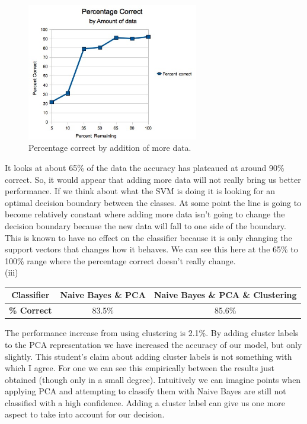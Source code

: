 \documentclass{report}
\begin{document}
\begin{figure}[h]
  \centering
  \includegraphics[height=60mm]{images/DiiChart.jpg}
  \caption{Percentage correct by addition of more data.}
  \label{fig}
\end{figure}
It looks at about 65\% of the data the accuracy has plateaued at around 90\%
correct. So, it would appear that adding more data will not really
bring us better performance. If we think about what the SVM is doing
it is looking for an optimal decision boundary between the classes. At
some point the line is going to become relatively constant where
adding more data isn't going to change the decision boundary because
the new data will fall to one side of the boundary. This is known to
have no effect on the classifier because it is only changing the
support vectors that changes how it behaves. We can see
this here at the 65\% to 100\% range where the percentage correct
doesn't really change.\\
(iii)\\
\begin{center}
  \begin{tabular}{|c|c|c|}
    \hline
    {\bf Classifier} & {\bf Naive Bayes \& PCA} & {\bf Naive Bayes \&
      PCA \& Clustering}\\
    \hline
    {\bf \% Correct} & 83.5\% & 85.6\%\\
    \hline
  \end{tabular}
\end{center}
The performance increase from using clustering is 2.1\%. By adding
cluster labels to the PCA representation we have increased the
accuracy of our model, but only slightly.
This student's claim about adding cluster labels is not something with
which I agree. For one we can see this empirically between the results
just obtained (though only in a small degree). Intuitively we can
imagine points when applying PCA and
attempting to classify them with Naive Bayes are still not classified
with a high confidence. Adding a cluster label can give us one more
aspect to take into account for our decision.\\
\end{document}
